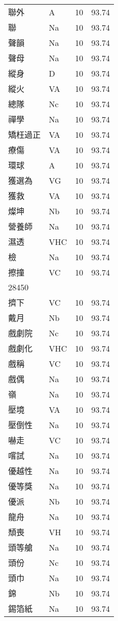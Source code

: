 \documentclass[twocolumn]{book}
\begin{document}
\begin{supertabular}{llrr}
聯外 & A & 10 &  93.74\\
聯 & Na & 10 &  93.74\\
聲韻 & Na & 10 &  93.74\\
聲母 & Na & 10 &  93.74\\
縱身 & D & 10 &  93.74\\
縱火 & VA & 10 &  93.74\\
總隊 & Nc & 10 &  93.74\\
禪學 & Na & 10 &  93.74\\
矯枉過正 & VA & 10 &  93.74\\
療傷 & VA & 10 &  93.74\\
環球 & A & 10 &  93.74\\
獲選為 & VG & 10 &  93.74\\
獲救 & VA & 10 &  93.74\\
燦坤 & Nb & 10 &  93.74\\
營養師 & Na & 10 &  93.74\\
濕透 & VHC & 10 &  93.74\\
檢 & Na & 10 &  93.74\\
擦撞 & VC & 10 &  93.74\\
28450\\
擠下 & VC & 10 &  93.74\\
戴月 & Nb & 10 &  93.74\\
戲劇院 & Nc & 10 &  93.74\\
戲劇化 & VHC & 10 &  93.74\\
戲稱 & VC & 10 &  93.74\\
戲偶 & Na & 10 &  93.74\\
嶺 & Na & 10 &  93.74\\
壓境 & VA & 10 &  93.74\\
壓倒性 & Na & 10 &  93.74\\
嚇走 & VC & 10 &  93.74\\
嚐試 & Na & 10 &  93.74\\
優越性 & Na & 10 &  93.74\\
優等獎 & Na & 10 &  93.74\\
優派 & Nb & 10 &  93.74\\
龍舟 & Na & 10 &  93.74\\
頹喪 & VH & 10 &  93.74\\
頭等艙 & Na & 10 &  93.74\\
頭份 & Nc & 10 &  93.74\\
頭巾 & Na & 10 &  93.74\\
錦 & Nb & 10 &  93.74\\
錫箔紙 & Na & 10 &  93.74\\

\end{supertabular}
\end{document}
